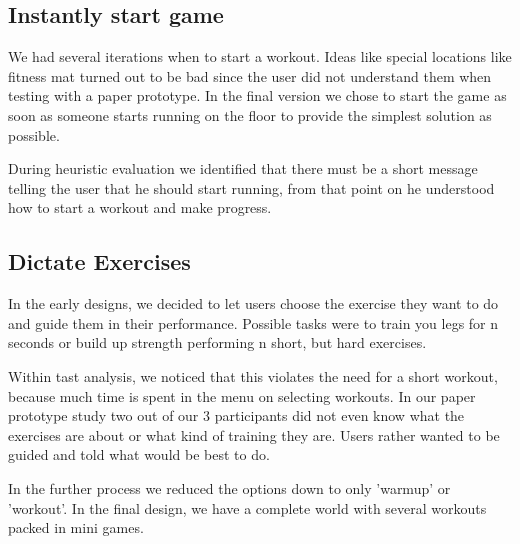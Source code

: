 \documentclass[twocolumn,showpacs,%
  nofootinbib,aps,superscriptaddress,%
  eqsecnum,prd,notitlepage,showkeys,10pt]{revtex4-1}
\begin{document}
\subsection{Instantly start game}

We had several iterations when to start a workout. Ideas like special locations like fitness mat turned out to be bad since the user did not understand them  when testing with a paper prototype. In the final version we chose to start the game as soon as someone starts running on the floor to provide the simplest   solution as possible.

During heuristic evaluation we identified that there must be a short message telling the user that he should start running, from that point on he understood  how to start a workout and make progress.

\subsection{Dictate Exercises}

In the early designs, we decided to let users choose the exercise they want to do and guide them in their performance. Possible tasks were to train you legs  for n seconds or build up strength performing n short, but hard exercises.

Within tast analysis, we noticed that this violates the need for a short workout, because much time is spent in the menu on selecting workouts. In our paper  prototype study two out of our 3 participants did not even know what the exercises are about or what kind of training they are. Users rather wanted to be     guided and told what would be best to do.

In the further process we reduced the options down to only 'warmup' or 'workout'. In the final design, we have a complete world with several workouts packed  in mini games.
\end{document}

